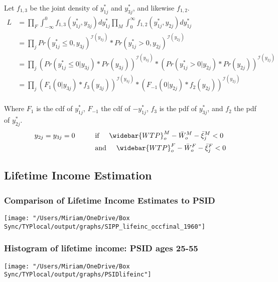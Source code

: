 \documentclass[11pt]{article}
\begin{document}
Let $f_{1,3}$ be the joint density of $y_{1j}^*$ and $y_{3j}^*$, and likewise $f_{1,2}$.
\begin{align*}
L &= \prod_F \int_{-\infty}^0 f_{1,3}(y_{1j}^*,y_{3j}) dy_{1j}^* \prod_M \int_{0}^{\infty} f_{1,2}(y_{1j}^*,y_{2j}) dy_{1j}^* \\
&= \prod_j Pr(y_{1j}^* \leq 0, y_{3j})^{\mathcal{I}(y_{3j})}*Pr(y_{1j}^* > 0, y_{2j})^{\mathcal{I}(y_{2j})} \\
&= \prod_j (Pr(y_{1j}^* \leq 0 | y_{3j})*Pr(y_{3j}))^{\mathcal{I}(y_{3j})}*(Pr(y_{1j}^* > 0| y_{2j})*Pr(y_{2j}))^{\mathcal{I}(y_{2j})}\\
&= \prod_j (F_{1}(0|y_{3j})*f_3(y_{3j}))^{\mathcal{I}(y_{3j})}*(F_{-1}( 0| y_{2j})*f_2(y_{2j}))^{\mathcal{I}(y_{2j})}\\
\end{align*}

Where $F_1$ is the cdf of $y_{1j}^*$, $F_{-1}$ the cdf of $-y_{1j}^*$, $f_3$ is the pdf of $y_{3j}^*$, and $f_2$ the pdf of $y_{2j}^*$.
\begin{align*}
 y_{2j}=y_{3j}=0 \hspace{10mm} &\text{if} \hspace{5mm} \widebar{WTP}^M_o - \bar{W}^M_o - \bar{\xi}^M_j < 0\\
 &\text{and} \hspace{5mm} \widebar{WTP}^F_o - \bar{W}^F_o -  \bar{\xi}^F_j < 0 \\
\end{align*}


\subsection{Lifetime Income Estimation}
\subsubsection{Comparison of Lifetime Income Estimates to PSID}

\texttt{[image: "/Users/Miriam/OneDrive/Box Sync/TYPlocal/output/graphs/SIPP\_lifeinc\_occfinal\_1960"]}
\subsubsection{Histogram of lifetime income: PSID ages 25-55}
\texttt{[image: "/Users/Miriam/OneDrive/Box Sync/TYPlocal/output/graphs/PSIDlifeinc"]}
\end{document}

